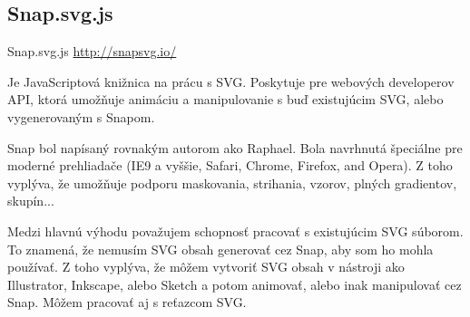 


\subsection{Snap.svg.js}

Snap.svg.js \url{http://snapsvg.io/}

Je JavaScriptová knižnica na prácu s SVG. Poskytuje pre webových developerov \acs{API}, ktorá umožňuje animáciu a manipulovanie s buď existujúcim SVG, alebo vygenerovaným s Snapom. 

Snap bol napísaný rovnakým autorom ako Raphael.  Bola navrhnutá špeciálne pre moderné prehliadače (IE9 a vyššie, Safari, Chrome, Firefox, and Opera). Z toho vyplýva, že umožňuje podporu maskovania, strihania, vzorov, plných gradientov, skupín... 



Medzi hlavnú výhodu považujem schopnosť pracovať s existujúcim SVG súborom. To znamená, že nemusím SVG obsah generovať cez Snap, aby som ho mohla používať. Z toho vyplýva, že môžem vytvoriť SVG obsah v nástroji ako Illustrator, Inkscape, alebo Sketch a potom animovať, alebo inak manipulovať cez Snap. Môžem pracovať aj s reťazcom SVG.

